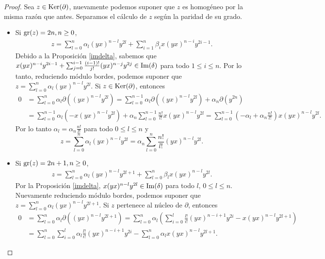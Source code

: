 \documentclass[fleqn,../tesis.tex]{subfiles}
\begin{document}
\begin{proof}
	Sea $z \in \operatorname{Ker}(\partial)$, nuevamente podemos suponer que $z$ es homogéneo por la misma razón que antes.
	Separamos el cálculo de $z$ según la paridad de su grado.
	\begin{itemize}
		\item Si $\operatorname{gr}(z) = 2n, n \geq 0$,
		\begin{align*}
			z = \sum_{l = 0}^n\alpha_l(yx)^{n - l}y^{2l} + \sum_{i = 1}^n\beta_ix(yx)^{n - i}y^{2i - 1}.
		\end{align*}
		Debido a la Proposición \ref{imdelta}, sabemos que $x(yx)^{n - i}y^{2i - 1} + \sum_{j = 0}^{i - 1}\frac{(i-1)!}{j!}(yx)^{n - j}y^{2j} \in \operatorname{Im}(\delta)$
		para todo $1 \leq i \leq n$.
		Por lo tanto, reduciendo módulo bordes, podemos suponer que $z = \sum_{l = 0}^n\alpha_l(yx)^{n - l}y^{2l}$.
		Si $z \in \operatorname{Ker}(\partial)$, entonces
		\begin{align*}
			0 &= \sum_{l = 0}^n\alpha_l\partial((yx)^{n - l}y^{2l})
				= \sum_{l = 0}^{n - 1}\alpha_l\partial((yx)^{n - l}y^{2l}) + \alpha_n\partial(y^{2n})\\
			&= \sum_{l = 0}^{n - 1}\alpha_l(-x(yx)^{n - l}y^{2l}) + \alpha_n\sum_{l = 0}^{n - 1}\frac{n!}{l!}x(yx)^{n - l}y^{2l}
				= \sum_{l = 0}^{n - 1}(-\alpha_l + \alpha_n\frac{n!}{l!})x(yx)^{n - l}y^{2l}.
		\end{align*}
		Por lo tanto $\alpha_l = \alpha_n\frac{n!}{l!}$ para todo $0 \leq l \leq n$ y
		\[
			z = 	\sum_{l = 0}^n\alpha_l(yx)^{n - l}y^{2l} = \alpha_n\sum_{l = 0}^n\frac{n!}{l!}(yx)^{n - l}y^{2l}.
		\]
		\item Si $\operatorname{gr}(z) = 2n + 1, n \geq 0$,
		\begin{align*}
			z = \sum_{l = 0}^n\alpha_l(yx)^{n - l}y^{2l + 1} + \sum_{l = 0}^n\beta_lx(yx)^{n - l}y^{2l}.
		\end{align*}
		Por la Proposición \ref{imdelta}, $x(yx)^{n - l}y^{2l} \in \operatorname{Im}(\delta)$ para todo $l$, $0 \leq l \leq n$.
		Nuevamente reduciendo módulo bordes, podemos suponer que $z = \sum_{l = 0}^n\alpha_l(yx)^{n - l}y^{2l + 1}$.
		Si $z$ pertenece al núcleo de $\partial$, entonces
		\begin{align*}
			0 &= \sum_{l = 0}^n\alpha_l\partial((yx)^{n - l}y^{2l + 1})
				= \sum_{l = 0}^n\alpha_l\left(\sum_{i = 0}^l\frac{l!}{i!}(yx)^{n - i + 1}y^{2i} -x(yx)^{n - l}y^{2l + 1}\right)\\
			&= \sum_{l = 0}^n\sum_{i = 0}^l\alpha_l\frac{l!}{i!}(yx)^{n - i + 1}y^{2i} - \sum_{l = 0}^n\alpha_lx(yx)^{n - l}y^{2l + 1}.
		\end{align*}

\end{itemize}
\end{proof}
\end{document}
